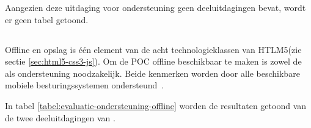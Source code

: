 Aangezien deze uitdaging voor ondersteuning geen deeluitdagingen bevat, wordt er geen tabel getoond.

% 
% 
% 
% 


\subsection{}
\label{sec:evaluatie-ondersteuning-offline}

Offline en opslag is één element van de acht technologieklassen van HTLM5(zie sectie \ref{sec:html5-css3-js}).
Om de POC offline beschikbaar te maken is zowel de  als  ondersteuning noodzakelijk.
Beide kenmerken worden door alle beschikbare mobiele besturingssystemen ondersteund~\cite{Deveria2013c}. 

In tabel \ref{tabel:evaluatie-ondersteuning-offline} worden de resultaten getoond van de twee deeluitdagingen van .

